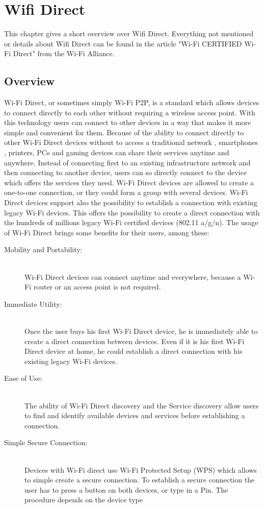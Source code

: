 \chapter{Wifi Direct}
\label{cha:WifiDirect}
This chapter gives a short overview over Wifi Direct. Everything not mentioned or details about Wifi Direct can be found in the article "Wi-Fi CERTIFIED Wi-Fi Direct" from the Wi-Fi Alliance\cite{wifialliance}.

\section{Overview}
\label{sec:Overview}
Wi-Fi Direct, or sometimes simply Wi-Fi P2P, is a standard which allows devices to connect directly to each other without requiring a wireless access point. With this technology users can connect to other devices in a way that makes it more simple and convenient for them. Because of the ability to connect directly to other Wi-Fi Direct devices without to access a traditional network , smartphones , printers, PCs and gaming devices can share their services anytime and anywhere. Instead of connecting first to an existing infrastructure network and then connecting to another device, users can so directly connect to the device which offers the services they need. Wi-Fi Direct devices are allowed to create a one-to-one connection, or they could form a group with several devices.
Wi-Fi Direct devices support also the possibility to establish a connection with existing legacy Wi-Fi devices. This offers the possibility to create a direct connection with the hundreds of millions legacy Wi-Fi certified devices (802.11 a/g/n). The usage of Wi-Fi Direct brings some benefits for their users, among these:\\
\begin{description}
  \item[Mobility and Portability:] \hfill \\ Wi-Fi Direct devices can connect anytime and everywhere, because a Wi-Fi router or an access point is not required.
  \item[Immediate Utility:] \hfill \\ Once the user buys his first Wi-Fi Direct device, he is immediately able to create a direct connection between devices. Even if it is his first Wi-Fi Direct device at home, he could establish a direct connection with his existing legacy Wi-Fi devices.
  \item[Ease of Use:] \hfill \\ The ability of Wi-Fi Direct discovery and the Service discovery allow users to find and identify available devices and services before establishing a connection.
  \item[Simple Secure Connection:] \hfill \\ Devices with Wi-Fi direct use Wi-Fi Protected Setup (WPS) which allows to simple create a secure connection. To establish a secure connection the user has to press a button on both devices, or type in a Pin. The procedure depends on the device type
\end{description}


